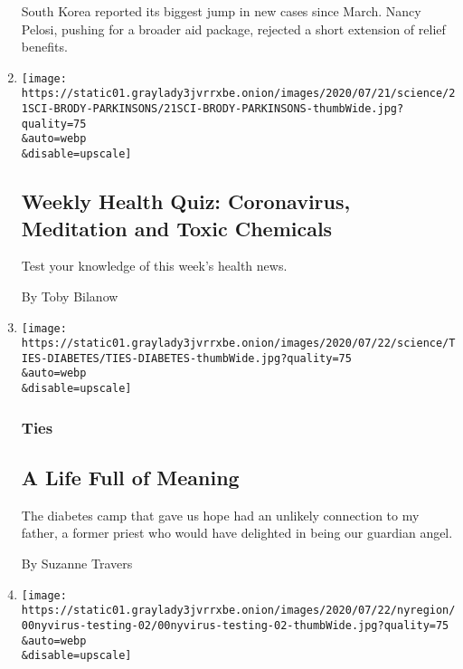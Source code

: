 \begin{enumerate}
  South Korea reported its biggest jump in new cases since March. Nancy
  Pelosi, pushing for a broader aid package, rejected a short extension
  of relief benefits.
\item
  \href{/interactive/2020/07/24/well/live/24healthquiz-07242020.html}{}

  \texttt{[image: https://static01.graylady3jvrrxbe.onion/images/2020/07/21/science/21SCI-BRODY-PARKINSONS/21SCI-BRODY-PARKINSONS-thumbWide.jpg?quality=75\\\&auto=webp\\\&disable=upscale]}

  \hypertarget{weekly-health-quiz-coronavirus-meditation-and-toxic-chemicals-1}{%
  \subsection{Weekly Health Quiz: Coronavirus, Meditation and Toxic
  Chemicals}\label{weekly-health-quiz-coronavirus-meditation-and-toxic-chemicals-1}}

  Test your knowledge of this week's health news.

  By Toby Bilanow
\item
  \href{/2020/07/24/well/family/a-life-full-of-meaning.html}{}

  \texttt{[image: https://static01.graylady3jvrrxbe.onion/images/2020/07/22/science/TIES-DIABETES/TIES-DIABETES-thumbWide.jpg?quality=75\\\&auto=webp\\\&disable=upscale]}

  \hypertarget{ties}{%
  \subsubsection{Ties}\label{ties}}

  \hypertarget{a-life-full-of-meaning}{%
  \subsection{A Life Full of Meaning}\label{a-life-full-of-meaning}}

  The diabetes camp that gave us hope had an unlikely connection to my
  father, a former priest who would have delighted in being our guardian
  angel.

  By Suzanne Travers
\item
  \href{/2020/07/23/nyregion/coronavirus-testing-nyc.html}{}

  \texttt{[image: https://static01.graylady3jvrrxbe.onion/images/2020/07/22/nyregion/00nyvirus-testing-02/00nyvirus-testing-02-thumbWide.jpg?quality=75\\\&auto=webp\\\&disable=upscale]}


\end{enumerate}
